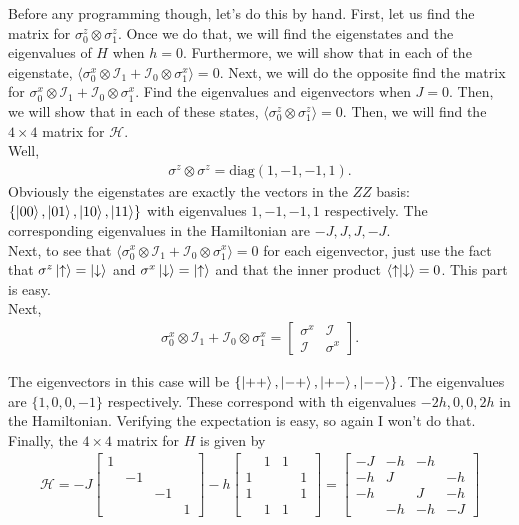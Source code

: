 \documentclass{book}
\theoremstyle{definition}
\newcommand{\had}{\mathcal{H}}
\newcommand{\Id}{\mathcal{I}}
\begin{document}
Before any programming though, let's do this by hand. First, let us find the matrix for $\sigma_0^z \otimes \sigma_1^z$. Once we do that, we will find the eigenstates and the eigenvalues of $H$ when $h=0$. Furthermore, we will show that in each of the eigenstate, $\langle \sigma_0^x\otimes \Id_1 + \Id_0 \otimes \sigma_1^x \rangle = 0$. Next, we will do the opposite find the matrix for $\sigma_0^x\otimes \Id_1 + \Id_0 \otimes \sigma_1^x$. Find the eigenvalues and eigenvectors when $J =0$. Then, we will show that in each of these states, $\langle \sigma_0^z \otimes \sigma_1^z \rangle = 0$. Then, we will find the $4\times 4$ matrix for $\had$. \\

Well,
\begin{align}
\sigma^z \otimes \sigma^z = \text{diag}(1,-1,-1,1).
\end{align} 
Obviously the eigenstates are exactly the vectors in the $ZZ$ basis: $\{ \ket{00}, \ket{01}, \ket{10}, \ket{11}\}$ with eigenvalues $1,-1,-1,1$ respectively. The corresponding eigenvalues in the Hamiltonian are $-J,J,J,-J$. \\

Next, to see that $\langle \sigma_0^x\otimes \Id_1 + \Id_0 \otimes \sigma_1^x \rangle = 0$ for each eigenvector, just use the fact that $\sigma^z\ket{\uparrow} = \ket{\downarrow}$ and $\sigma^x\ket{\downarrow} = \ket{\uparrow}$ and that the inner product $\braket{\uparrow}{\downarrow} = 0$. This part is easy.\\

Next, 
\begin{align}
\sigma_0^x\otimes \Id_1 + \Id_0 \otimes \sigma_1^x = \begin{bmatrix}
\sigma^x & \Id \\ \Id & \sigma^x
\end{bmatrix}.
\end{align}

The eigenvectors in this case will be $\{ \ket{++}, \ket{-+}, \ket{+-}, \ket{--}  \}$. The eigenvalues are $\{1,0,0,-1\}$ respectively. These correspond with th eigenvalues $-2h,0,0,2h$ in the Hamiltonian. Verifying the expectation is easy, so again I won't do that.\\

Finally, the $4\times 4$ matrix for $H$ is given by
\begin{align}
\had = -J\begin{bmatrix}
1&&&\\&-1&&\\&&-1&\\&&&1
\end{bmatrix} - h\begin{bmatrix}
&1&1&\\1&&&1\\1&&&1\\&1&1&
\end{bmatrix} = \begin{bmatrix}
-J&-h&-h&\\-h&J&&-h\\-h&&J&-h\\&-h&-h&-J
\end{bmatrix}
\end{align}
\end{document}
